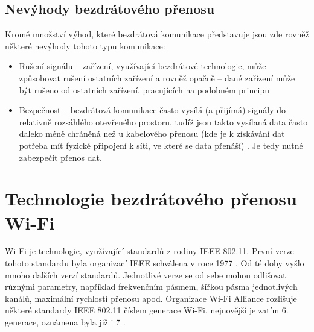 \subsection*{Nevýhody bezdrátového přenosu}
Kromě množství výhod, které bezdrátová komunikace představuje jsou zde rovněž některé nevýhody tohoto typu komunikace:

\begin{itemize}
    \item Rušení signálu – zařízení, využívající bezdrátové technologie, může způsobovat rušení ostatních zařízení a rovněž opačně – dané zařízení může být rušeno od ostatních zařízení, pracujících na podobném principu
    \item Bezpečnost – bezdrátová komunikace často vysílá (a přijímá) signály do relativně rozsáhlého otevřeného prostoru, tudíž jsou takto vysílaná data často daleko méně chráněná než u kabelového přenosu (kde je k získávání dat potřeba mít fyzické připojení k síti, ve které se data přenáší) \cite{wirelessComunication}. Je tedy nutné zabezpečit přenos dat.
\end{itemize}

\section{Technologie bezdrátového přenosu Wi-Fi}

Wi-Fi je technologie, využívající standardů z rodiny IEEE 802.11. První verze tohoto standardu byla organizací IEEE schválena v roce 1977 \cite{4technologie}. Od té doby vyšlo mnoho dalších verzí standardů. Jednotlivé verze se od sebe mohou odlišovat různými parametry, například frekvenčním pásmem, šířkou pásma jednotlivých kanálů, maximální rychlostí přenosu apod. Organizace Wi-Fi Alliance rozlišuje některé standardy IEEE 802.11 číslem generace Wi-Fi, nejnovější je zatím 6. generace, oznámena byla již i 7 \cite{WiFi7}. 

